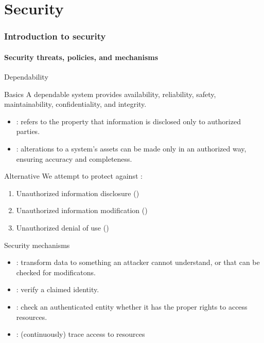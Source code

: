 \part{Security}
\section{Introduction to security}
\subsection{Security threats, policies, and mechanisms}
\begin{slide}{Dependability}
  \begin{block}{Basics}
    A dependable system provides availability, reliability, safety, maintainability, confidentiality, and
    integrity.
    \begin{itemize}
    \item {}: refers to the property that information is disclosed
      only to authorized parties.
    \item {}: alterations to a system's assets can be made only in an authorized way, ensuring
      accuracy and completeness.
    \end{itemize}
  \end{block}

  \begin{block}{Alternative}
    We attempt to protect against :
    \begin{enumerate}
    \item Unauthorized information disclosure ()
    \item Unauthorized information modification ()
    \item Unauthorized denial of use ()
    \end{enumerate}
  \end{block}
\end{slide}
\begin{slide}{Security mechanisms}
  \begin{itemize}
  \item {}: transform data to something an attacker cannot understand, or that can be checked
    for modificatons.
  \item {}: verify a claimed identity.
  \item {}: check an authenticated entity whether it has the proper rights to access resources.
  \item {}: (continuously) trace access to resources
  \end{itemize}
\end{slide}
